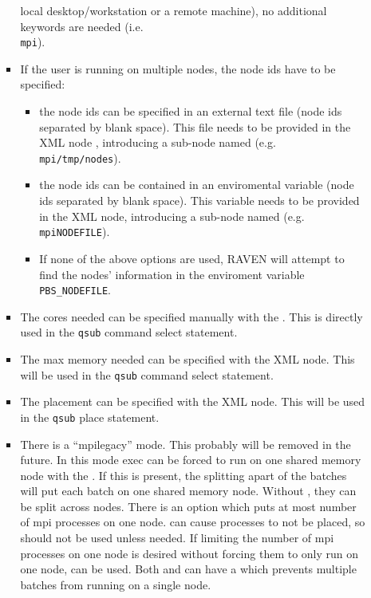 \begin{itemize}
\begin{itemize}
\begin{itemize}
             local desktop/workstation or a remote machine), no additional
             keywords are needed (i.e.\\
             \texttt{mpi}).
           \item If the user is running on multiple nodes, the node ids have
             to be specified:
           \begin{itemize}
              \item the node ids can be specified in an external text file
                (node ids separated by blank space).
                This file needs to be provided in the XML node ,
                introducing a sub-node named  (e.g.\\
\texttt{mpi}\texttt{/tmp/nodes}).
              \item the node ids can be contained in an enviromental variable
                (node ids separated by blank space).
                This variable needs to be provided in the  XML
                node, introducing a sub-node named  (e.g.\\
\texttt{mpi}\texttt{NODEFILE}).
                \item If none of the above options are used, RAVEN will attempt
                  to find the nodes' information in the enviroment variable
                  \texttt{PBS\_NODEFILE}.
           \end{itemize}
         \item The cores needed can be specified manually with the
           .  This is directly used in the
           \texttt{qsub} command select statement.
         \item The max memory needed can be specified with the
            XML node.  This will be used in the
           \texttt{qsub} command select statement.
         \item The placement can be specified with the 
           XML node.  This will be used in the \texttt{qsub} place
           statement.
         \item There is a ``mpilegacy'' mode.  This probably will be removed in the future.  In this mode exec can be forced to run on one shared memory node with the .  If this is present, the splitting apart of the batches will put each batch on one shared memory node.  Without , they can be split across nodes.  There is an option  which puts at most  number of mpi processes on one node.   can cause processes to not be placed, so  should not be used unless needed.  If limiting the number of mpi processes on one node is desired without forcing them to only run on one node,  can be used.  Both  and   can have a  which prevents multiple batches from running on a single node.

\end{itemize}
\end{itemize}
\end{itemize}
